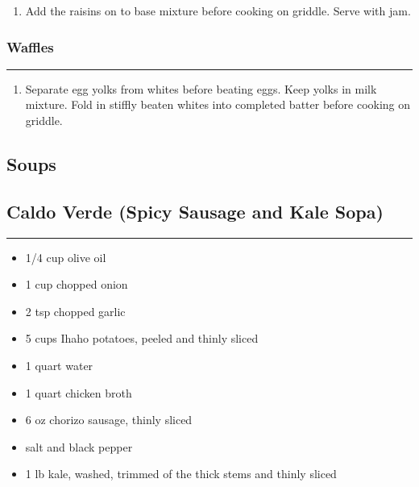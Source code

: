 \documentclass{article}
\begin{document}
\begin{enumerate}
    \item 
        Add the raisins on to base mixture before cooking on griddle. Serve with jam.
\end{enumerate}

\subsubsection{Waffles} 
\noindent\rule[0.5ex]{\linewidth}{0.5pt}

\begin{enumerate}
    \item 
        Separate egg yolks from whites before beating eggs. Keep yolks in milk mixture. Fold in stiffly beaten whites into completed batter before cooking on griddle.
\end{enumerate}
\newpage

\vspace*{\fill}
\begin{center}
    \section{Soups}
\end{center}
\vspace*{\fill}
\newpage

\subsection{Caldo Verde (Spicy Sausage and Kale Sopa)} 
\noindent\rule[0.5ex]{\linewidth}{1pt}

\begin{framed}
    \begin{itemize}
        \item 1/4 cup olive oil
        \item 1 cup chopped onion
        \item 2 tsp chopped garlic
        \item 5 cups Ihaho potatoes, peeled and thinly sliced
        \item 1 quart water
        \item 1 quart chicken broth
        \item 6 oz chorizo sausage, thinly sliced
        \item salt and black pepper
        \item 1 lb kale, washed, trimmed of the thick stems and thinly sliced
    \end{itemize}
\end{framed}
\end{document}
